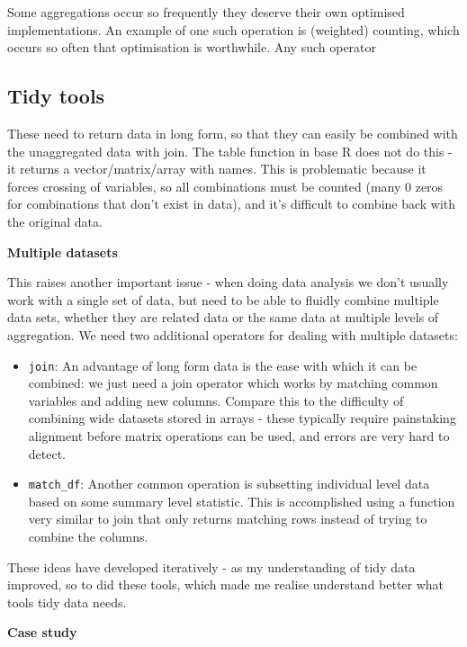 \documentclass[oneside]{article}
\begin{document}
Some aggregations occur so frequently they deserve their own optimised implementations. An example of one such operation is (weighted) counting, which occurs so often that optimisation is worthwhile. Any such operator

\subsection{Tidy tools}

These need to return data in long form, so that they can easily be combined with the unaggregated data with join. The table function in base R does not do this - it returns a vector/matrix/array with names. This is problematic because it forces crossing of variables, so all combinations must be counted (many 0 zeros for combinations that don't exist in data), and it's difficult to combine back with the original data.

\textbf{Multiple datasets}

This raises another important issue - when doing data analysis we don't usually work with a single set of data, but need to be able to fluidly combine multiple data sets, whether they are related data or the same data at multiple levels of aggregation. We need two additional operators for dealing with multiple datasets:

\begin{itemize}

\item \texttt{join}: An advantage of long form data is the ease with which it can be combined: we just need a join operator which works by matching common variables and adding new columns. Compare this to the difficulty of combining wide datasets stored in arrays - these typically require painstaking alignment before matrix operations can be used, and errors are very hard to detect. 

\item \texttt{match\_df}: Another common operation is subsetting individual level data based on some summary level statistic. This is accomplished using a function very similar to join that only returns matching rows instead of trying to combine the columns.

\end{itemize}

These ideas have developed iteratively - as my understanding of tidy data improved, so to did these tools, which made me realise understand better what tools tidy data needs.

\textbf{Case study}
\end{document}
